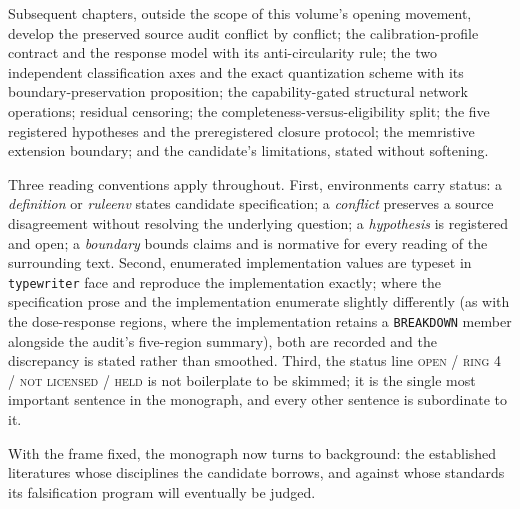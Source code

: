 Subsequent chapters, outside the scope of this volume's opening movement, develop the preserved source audit conflict by conflict; the calibration-profile contract and the response model with its anti-circularity rule; the two independent classification axes and the exact quantization scheme with its boundary-preservation proposition; the capability-gated structural network operations; residual censoring; the completeness-versus-eligibility split; the five registered hypotheses and the preregistered closure protocol; the memristive extension boundary; and the candidate's limitations, stated without softening.

Three reading conventions apply throughout. First, environments carry status: a \emph{definition} or \emph{ruleenv} states candidate specification; a \emph{conflict} preserves a source disagreement without resolving the underlying question; a \emph{hypothesis} is registered and open; a \emph{boundary} bounds claims and is normative for every reading of the surrounding text. Second, enumerated implementation values are typeset in \texttt{typewriter} face and reproduce the implementation exactly; where the specification prose and the implementation enumerate slightly differently (as with the dose-response regions, where the implementation retains a \texttt{BREAKDOWN} member alongside the audit's five-region summary), both are recorded and the discrepancy is stated rather than smoothed. Third, the status line \textsc{open / ring 4 / not licensed / held} is not boilerplate to be skimmed; it is the single most important sentence in the monograph, and every other sentence is subordinate to it.

With the frame fixed, the monograph now turns to background: the established literatures whose disciplines the candidate borrows, and against whose standards its falsification program will eventually be judged.
